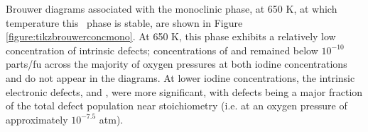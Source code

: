 Brouwer diagrams associated with the monoclinic phase, at 650 K, at which temperature this \zirconia\ phase is stable, are shown in Figure \ref{figure:tikzbrouwerconcmono}. At 650 K, this phase exhibits a relatively low concentration of intrinsic defects; concentrations of  and  remained below $10^{-10}$ parts/fu across the majority of oxygen pressures at both iodine concentrations and do not appear in the diagrams. At lower iodine concentrations, the intrinsic electronic defects,  and , were more significant, with  defects being a major fraction of the total defect population near stoichiometry (i.e. at an oxygen pressure of approximately $10^{-7.5}$ atm). 

\begin{figure}[ht] %
\begin{center}
\end{center}
\end{figure}
